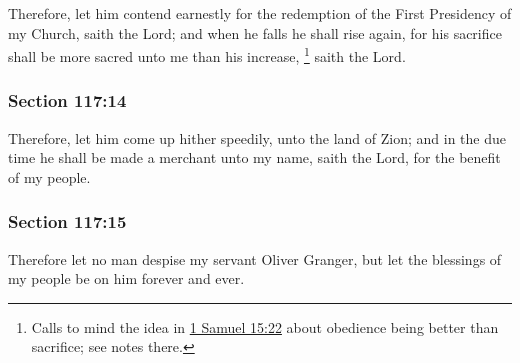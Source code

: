 		Therefore, let him contend earnestly for the redemption of the First Presidency of my Church, saith the Lord; and when he falls he shall rise again, for his sacrifice shall be more sacred unto me than his increase,%
			\footnote{%
				Calls to mind the idea in \hyperref[1SAMUEL-15-22]{1 Samuel 15:22} about obedience being better than sacrifice; see notes there.
				}
		saith the Lord.


	\subsubsection{Section 117:14} %
		\label{DC117-14}

		Therefore, let him come up hither speedily, unto the land of Zion; and in the due time he shall be made a merchant unto my name, saith the Lord, for the benefit of my people.


	\subsubsection{Section 117:15} %
		\label{DC117-15}

		Therefore let no man despise my servant Oliver Granger, but let the blessings of my people be on him forever and ever.


